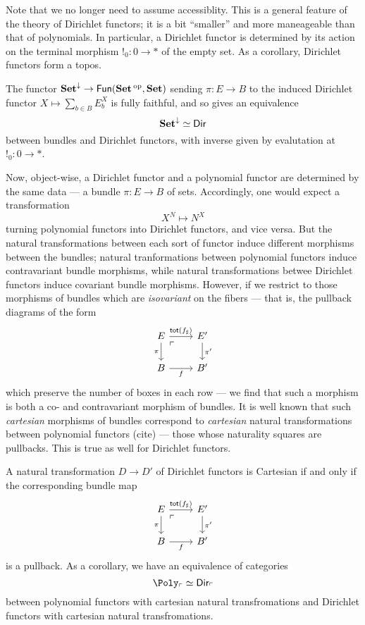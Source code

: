 Note that we no longer need to assume accessiblity. This is a general feature of
the theory of Dirichlet functors; it is a bit ``smaller'' and more maneageable
than that of polynomials. In particular, a Dirichlet functor is determined by
its action on the terminal morphism $!_0 : 0 \to \ast$ of the empty set. As a corollary, Dirichlet functors form a topos.

\begin{thm}\label{thm:dirichlet.set.equivalence}
The functor $\operatorname{\textbf{Set}}^{\downarrow} \to \mathsf{{Fun}}(\operatorname{\textbf{Set}}\operatorname{^\text{op}}, \operatorname{\textbf{Set}})$ sending $\pi : E
\to B$ to the induced Dirichlet functor $X \mapsto \sum_{b \in B} E_b^X$ is
fully faithful, and so gives an equivalence
$$\operatorname{\textbf{Set}}^{\downarrow} \simeq \operatorname{\mathsf{{Dir}}}$$
between bundles and Dirichlet functors, with inverse given by evalutation at
$!_0 : 0 \to \ast$.
\end{thm}


Now, object-wise, a Dirichlet functor and a polynomial functor are determined by
the same data --- a bundle $\pi : E \to B$ of sets. Accordingly, one would
expect a transformation
$$X^N \mapsto N^X$$
turning polynomial functors into Dirichlet functors, and vice versa. But the
natural transformations between each sort of functor induce different morphisms
between the bundles; natural tranformations between polynomial functors induce
contravariant bundle morphisms, while natural transformations betwee Dirichlet
functors induce covariant bundle morphisms. However, if we restrict to those
morphisms of bundles which are \emph{isovariant} on the fibers --- that is, the
pullback diagrams of the form
\[
  \begin{tikzcd}
E \arrow[r, "\term{tot}(f_{\sharp})"] \arrow[d, "\pi"'] \arrow[dr, phantom,
"\ulcorner" very near start] & E' \arrow[d, "\pi'"] \\
B \arrow[r, "f"']                                       & B'                  
\end{tikzcd}
\]
which preserve the number of boxes in each row --- we find that such a morphism
is both a co- and contravariant morphism of bundles. It is well known that such
\emph{cartesian} morphisms of bundles correspond to \emph{cartesian} natural
transformations between polynomial functors (cite) --- those whose naturality
squares are pullbacks. This is true as well for Dirichlet functors.
\begin{thm}
A natural transformation $D \to D'$ of Dirichlet functors is Cartesian if and
only if the corresponding bundle map
\[
  \begin{tikzcd}
E \arrow[r, "\term{tot}(f_{\sharp})"] \arrow[d, "\pi"'] \arrow[dr, phantom,
"\ulcorner" very near start] & E' \arrow[d, "\pi'"] \\
B \arrow[r, "f"']                                       & B'                  
\end{tikzcd}
\]
is a pullback. As a corollary, we have an equivalence of categories
$$\Poly_{\ulcorner} \simeq \Dir_{\ulcorner}$$
between polynomial functors with cartesian natural transfromations and Dirichlet
functors with cartesian natural transfromations.
\end{thm}

